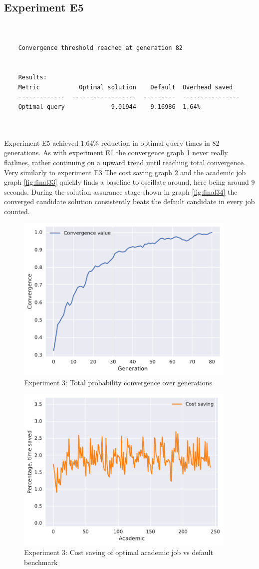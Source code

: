 \documentclass[a4paper,english]{report}
\begin{document}
	\subsection{Experiment E5}
	\begin{verbatim}
	
	
	Convergence threshold reached at generation 82
	
	
	Results:
	Metric           Optimal solution    Default  Overhead saved
	-------------  ------------------  ---------  ----------------
	Optimal query             9.01944    9.16986  1.64%

	
	\end{verbatim}
	Experiment E5 achieved 1.64\% reduction in optimal query times in 82 generations. As with experiment E1 the convergence graph \ref{fig:final31} never really flatlines, rather continuing on a upward trend until reaching total convergence. Very similarly to experiment E3 The cost saving graph \ref{fig:final32} and the academic job graph \ref{fig:final33} quickly finds a baseline to oscillate around, here being around 9 seconds. During the solution assurance stage shown in graph \ref{fig:final34} the converged candidate solution consistently beats the default candidate in every job counted.
	\clearpage 
	\begin{figure}[H]
		\centering
		\includegraphics[width=300pt]{runlogs/final9/1}
		\caption{Experiment 3: Total probability convergence over generations}
		\label{fig:final31}
	\end{figure}
	\begin{figure}[H]
		\centering
		\includegraphics[width=300pt]{runlogs/final9/2}
		\caption{Experiment 3: Cost saving of optimal academic job vs default benchmark}
		\label{fig:final32}
	\end{figure}
\end{document}
